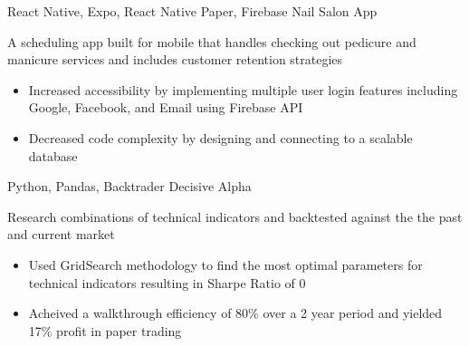 

\begin{cventries}

  \cventry
    {React Native, Expo, React Native Paper, Firebase} %
    {Nail Salon App} %
    {}
    {}
    {
      \begin{cvitems} %
        \item[] { A scheduling app built for mobile that handles checking out pedicure and manicure services and includes customer retention strategies}
        \begin{itemize}
            \item {Increased accessibility by implementing multiple user login features including Google, Facebook, and Email using Firebase API}
            \item {Decreased code complexity by designing and connecting to a scalable database}
        \end{itemize}        
      \end{cvitems}
    }
    
    \cventry
    {Python, Pandas, Backtrader} %
    {Decisive Alpha} %
    {}
    {}
    {
      \begin{cvitems} %
        \item[] {Research combinations of technical indicators and backtested against the the past and current market}
        \begin{itemize}
            \item {Used GridSearch methodology to find the most optimal parameters for technical indicators resulting in Sharpe Ratio of 0}
            \item {Acheived a walkthrough efficiency of 80\% over a 2 year period and yielded 17\% profit in paper trading}
        \end{itemize}        
      \end{cvitems}
    }
    

\end{cventries}
